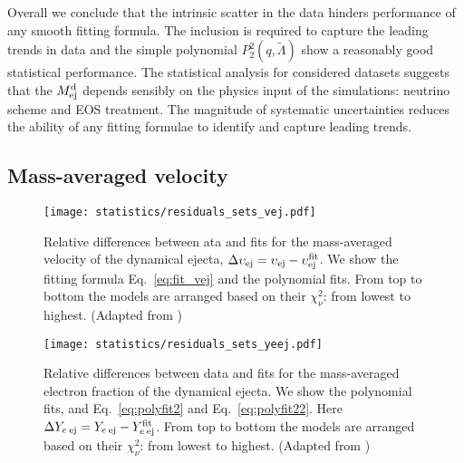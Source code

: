 Overall we conclude that the intrinsic scatter in the data hinders performance 
of any smooth fitting formula. The inclusion \mr{} is required to capture the leading 
trends in data and the simple polynomial $P_2^2(q,\tilde{\Lambda})$ show a reasonably 
good statistical performance.
%
The statistical analysis for considered datasets suggests that the $M^{\text{d}}_{\text{ej}}$ depends 
sensibly on the physics input of the simulations: neutrino scheme and \ac{EOS} treatment.
The magnitude of systematic uncertainties reduces the ability of any fitting formulae 
to identify and capture leading trends.




\subsection{Mass-averaged velocity}

\begin{figure}[t]
    \centering 
    \texttt{[image: statistics/residuals\_sets\_vej.pdf]}
    \caption{
        Relative differences between ata and fits for the mass-averaged velocity of the dynamical ejecta, $\Delta \upsilon_{\rm ej} = \upsilon_{\rm ej} - \upsilon^{\rm fit}_{\rm ej}$.
        We show the fitting formula Eq.~\eqref{eq:fit_vej} and the polynomial fits.
        From top to bottom the models are arranged based on their $\chi_{\nu}^2$: from lowest to highest.
        (Adapted from \citet{Nedora:2020qtd})
    }
    \label{fig:ejecta:dyn:v}
\end{figure}

\begin{figure}[t]
    \centering 
    \texttt{[image: statistics/residuals\_sets\_yeej.pdf]}
    \caption{
        Relative differences between data and fits for the 
        mass-averaged electron fraction of the dynamical ejecta.
        We show the polynomial fits, and Eq.~\eqref{eq:polyfit2} and Eq.~\eqref{eq:polyfit22}.
        Here $\Delta Y_{e\: \rm ej} = Y_{e\: \rm ej} - Y^{\rm fit}_{e\: \rm ej}$.
        From top to bottom the models are arranged based on their $\chi_{\nu}^2$: 
        from lowest to highest.
        (Adapted from \citet{Nedora:2020qtd})
    }
    \label{fig:ejecta:dyn:y}
\end{figure}

